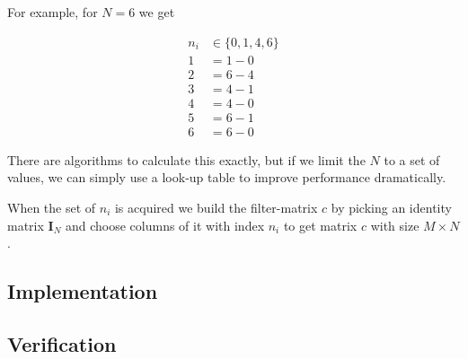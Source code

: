 \documentclass[oneside, a4paper, openany]{memoir}
\begin{document}
For example, for $N=6$ we get

\begin{align}
n_i&\in\{0,1,4,6\}\\
1 &= 1-0\\
2 &= 6-4\\
3 &= 4-1\\
4 &= 4-0\\
5 &= 6-1\\
6 &= 6-0
\end{align}


There are algorithms to calculate this exactly, but if we limit the $N$ to a set of values, we can simply use a look-up table to improve performance dramatically.

When the set of $n_i$ is acquired we build the filter-matrix $c$ by picking an identity matrix $\mathbf{I}_N$ and choose columns of it with index $n_i$ to get matrix $c$ with size $M \times N$.

\subsection{Implementation}

\subsection{Verification}
\end{document}
